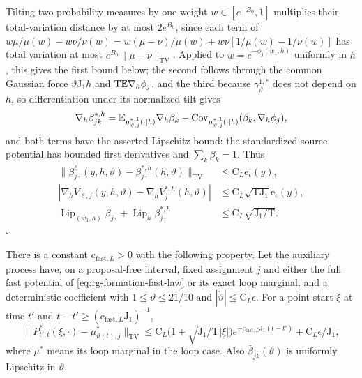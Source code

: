 Tilting two probability measures by one weight \(w\in[e^{-B_0},1]\) multiplies
their total-variation distance by at most \(2e^{B_0}\), since each term of
\(w\mu/\mu(w)-w\nu/\nu(w)=w(\mu-\nu)/\mu(w)+w\nu[1/\mu(w)-1/\nu(w)]\) has
total variation at most \(e^{B_0}\|\mu-\nu\|_{\mathrm{TV}}\). Applied to
\(w=e^{-\phi_j(w_1,h)}\) uniformly in \(h\), this gives the first bound below;
the second follows through the common Gaussian force
\(\vartheta\mathrm J_1h\) and \(\mathrm T\mathbb E\nabla_h\phi_j\), and the third
because \(\gamma^{1,*}_\vartheta\) does not depend on \(h\), so differentiation
under its normalized tilt gives
\[
\nabla_h\beta^{*,h}_{jk}
=\mathbb E_{\mu^{*,1}_{\vartheta,j}(\cdot\mid h)}\nabla_h\beta_k
-\operatorname{Cov}_{\mu^{*,1}_{\vartheta,j}(\cdot\mid h)}
 (\beta_k,\nabla_h\phi_j),
\]
and both terms have the asserted Lipschitz bound: the standardized source
potential has bounded first derivatives and \(\sum_k\beta_k=1\). Thus
\begin{align}
 \|\beta_{j\cdot}^\ell(y,h,\vartheta)
          -\beta_{j\cdot}^{*,h}(h,\vartheta)\|_{\mathrm{TV}}
 &\le \mathrm C_L\mathrm e_\epsilon(y),
 \label{eq:rg-formation-parent-row-environment}\\
 |\nabla_hV_{\ell,j}(y,h,\vartheta)
           -\nabla_hV_j^{*,h}(h,\vartheta)|
 &\le \mathrm C_L\sqrt{\mathrm T\mathrm J_1} \mathrm e_\epsilon(y),
 \label{eq:rg-formation-parent-force-environment}\\
 \operatorname{Lip}_{(w_1,h)}\beta_{j\cdot}
       +\operatorname{Lip}_h\beta_{j\cdot}^{*,h}
 &\le \mathrm C_L\sqrt{\mathrm J_1/\mathrm T}.
 \label{eq:rg-formation-row-fast-lipschitz}
\end{align}
\hfill\(\square\)

There is a constant \(\mathrm c_{\mathrm{fast},L}>0\) with the following property.
Let the auxiliary process have, on a proposal-free interval, fixed assignment
\(j\) and either the full fast potential of \cref{eq:rg-formation-fast-law} or
its exact loop marginal, and a deterministic coefficient with
\(1\le\vartheta\le21/10\) and \(|\dot\vartheta|\le\mathrm C_L\epsilon\). For a
point start \(\xi\) at time \(t'\) and \(t-t'\ge(\mathrm c_{\mathrm{fast},L}\mathrm J_1)^{-1}\),
\begin{equation}
 \|P^*_{t',t}(\xi,\cdot)-\mu^*_{\vartheta(t),j}\|_{\mathrm{TV}}
 \le \mathrm C_L\bigl(1+\sqrt{\mathrm J_1/\mathrm T}|\xi|\bigr)
              e^{-\mathrm c_{\mathrm{fast},L}\mathrm J_1(t-t')}
       +\mathrm C_L\epsilon/\mathrm J_1,
 \label{eq:rg-formation-fast-mixing-bound}
\end{equation}
where \(\mu^*\) means its loop marginal in the loop case. Also
\(\bar\beta_{jk}(\vartheta)\) is uniformly Lipschitz in \(\vartheta\).

